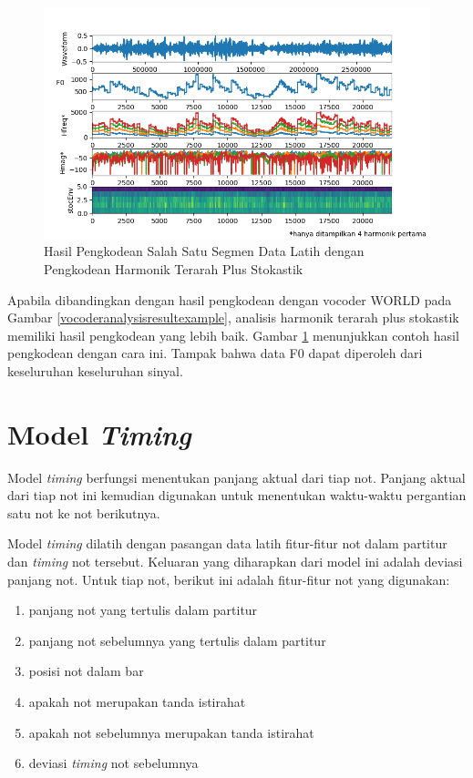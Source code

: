 \begin{figure}[h]
    \centering
    \includegraphics[width=\textwidth]{resources/Analisis_guidedtwmhps.png}
    \caption{Hasil Pengkodean Salah Satu Segmen Data Latih dengan Pengkodean Harmonik Terarah Plus Stokastik} \label{guidedtwmhpsanalysisresultexample}
\end{figure}

Apabila dibandingkan dengan hasil pengkodean dengan vocoder WORLD pada Gambar \ref{vocoderanalysisresultexample}, analisis harmonik terarah plus stokastik memiliki hasil pengkodean yang lebih baik. Gambar \ref{guidedtwmhpsanalysisresultexample} menunjukkan contoh hasil pengkodean dengan cara ini. Tampak bahwa data F0 dapat diperoleh dari keseluruhan keseluruhan sinyal.

\section{Model \textit{Timing}}

Model \textit{timing} berfungsi menentukan panjang aktual dari tiap not. Panjang aktual dari tiap not ini kemudian digunakan untuk menentukan waktu-waktu pergantian satu not ke not berikutnya.

Model \textit{timing} dilatih dengan pasangan data latih fitur-fitur not dalam partitur dan \textit{timing} not tersebut. Keluaran yang diharapkan dari model ini adalah deviasi panjang not. Untuk tiap not, berikut ini adalah fitur-fitur not yang digunakan:

\begin{enumerate}
    \item panjang not yang tertulis dalam partitur
    \item panjang not sebelumnya yang tertulis dalam partitur
    \item posisi not dalam bar
    \item apakah not merupakan tanda istirahat
    \item apakah not sebelumnya merupakan tanda istirahat
    \item deviasi \textit{timing} not sebelumnya
\end{enumerate}

